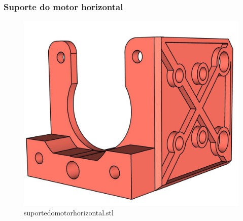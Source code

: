 \begin{frame}
    \frametitle{Suporte do motor horizontal}
        \begin{figure}
            \centering
            \includegraphics[scale = 0.12]{figuras/ressuportemotorhorizontalf}
            \caption{suportedomotorhorizontal.stl}
        \end{figure}
\end{frame}

